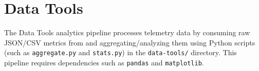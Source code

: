 \section{Data Tools}
\label{sec:data_tools}
The Data Tools analytics pipeline processes telemetry data by consuming raw JSON/CSV metrics from \texttt{} and aggregating/analyzing them using Python scripts (such as \texttt{aggregate.py} and \texttt{stats.py}) in the \texttt{data-tools/} directory. This pipeline requires dependencies such as \texttt{pandas} and \texttt{matplotlib}.